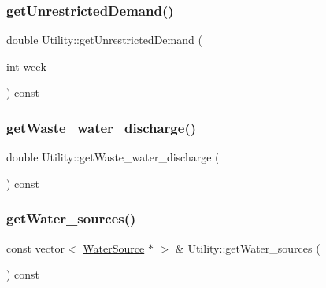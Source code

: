 \mbox{\label{classUtility_ae2d1b744d965d9b916dd7d3103631c92_ae2d1b744d965d9b916dd7d3103631c92}} 
\subsubsection{\texorpdfstring{get\+Unrestricted\+Demand()}{getUnrestrictedDemand()}\hspace{0.1cm}{\footnotesize\ttfamily [2/2]}}
{\footnotesize\ttfamily double Utility\+::get\+Unrestricted\+Demand (\begin{DoxyParamCaption}\item[{int}]{week }\end{DoxyParamCaption}) const}

\mbox{\label{classUtility_a68dc298c3078ff450cdc7b6a69422da1_a68dc298c3078ff450cdc7b6a69422da1}} 
\subsubsection{\texorpdfstring{get\+Waste\+\_\+water\+\_\+discharge()}{getWaste\_water\_discharge()}}
{\footnotesize\ttfamily double Utility\+::get\+Waste\+\_\+water\+\_\+discharge (\begin{DoxyParamCaption}{ }\end{DoxyParamCaption}) const}

\mbox{\label{classUtility_ab815008a3fab281951892aef1e06407a_ab815008a3fab281951892aef1e06407a}} 
\subsubsection{\texorpdfstring{get\+Water\+\_\+sources()}{getWater\_sources()}}
{\footnotesize\ttfamily const vector$<$ \mbox{\hyperlink{classWaterSource}{Water\+Source}} $\ast$ $>$ \& Utility\+::get\+Water\+\_\+sources (\begin{DoxyParamCaption}{ }\end{DoxyParamCaption}) const}

